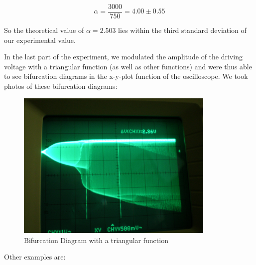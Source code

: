 $$\boxed{\alpha = \frac{3000}{750} = 4.00 \pm 0.55}$$

So the theoretical value of $\alpha = 2.503$ lies within the third standard deviation of our experimental value.

In the last part of the experiment, we modulated the amplitude of the driving voltage with a triangular function (as well as other functions) and were thus able to see bifurcation diagrams in the x-y-plot function of the oscilloscope. We took photos of these bifurcation diagrams:

\begin{figure}[H]
\centering \includegraphics[width= 0.85\textwidth]{Fotos2/16.JPG}
\caption{Bifurcation Diagram with a triangular function}
\end{figure}

Other examples are:

